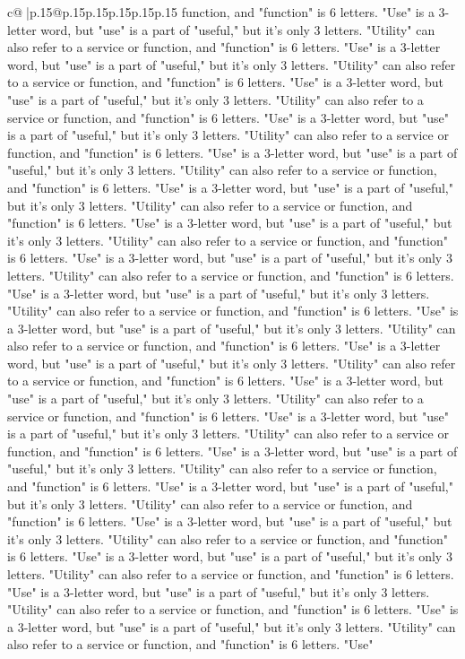 \documentclass{article}
\begin{document}
{\begin{supertabular}{c@{$\;$}|p{.15\linewidth}@{}p{.15\linewidth}p{.15\linewidth}p{.15\linewidth}p{.15\linewidth}p{.15\linewidth}}
{{{function, and "function" is 6 letters. "Use" is a 3{-}letter word, but "use" is a part of "useful," but it's only 3 letters. "Utility" can also refer to a service or function, and "function" is 6 letters. "Use" is a 3{-}letter word, but "use" is a part of "useful," but it's only 3 letters. "Utility" can also refer to a service or function, and "function" is 6 letters. "Use" is a 3{-}letter word, but "use" is a part of "useful," but it's only 3 letters. "Utility" can also refer to a service or function, and "function" is 6 letters. "Use" is a 3{-}letter word, but "use" is a part of "useful," but it's only 3 letters. "Utility" can also refer to a service or function, and "function" is 6 letters. "Use" is a 3{-}letter word, but "use" is a part of "useful," but it's only 3 letters. "Utility" can also refer to a service or function, and "function" is 6 letters. "Use" is a 3{-}letter word, but "use" is a part of "useful," but it's only 3 letters. "Utility" can also refer to a service or function, and "function" is 6 letters. "Use" is a 3{-}letter word, but "use" is a part of "useful," but it's only 3 letters. "Utility" can also refer to a service or function, and "function" is 6 letters. "Use" is a 3{-}letter word, but "use" is a part of "useful," but it's only 3 letters. "Utility" can also refer to a service or function, and "function" is 6 letters. "Use" is a 3{-}letter word, but "use" is a part of "useful," but it's only 3 letters. "Utility" can also refer to a service or function, and "function" is 6 letters. "Use" is a 3{-}letter word, but "use" is a part of "useful," but it's only 3 letters. "Utility" can also refer to a service or function, and "function" is 6 letters. "Use" is a 3{-}letter word, but "use" is a part of "useful," but it's only 3 letters. "Utility" can also refer to a service or function, and "function" is 6 letters. "Use" is a 3{-}letter word, but "use" is a part of "useful," but it's only 3 letters. "Utility" can also refer to a service or function, and "function" is 6 letters. "Use" is a 3{-}letter word, but "use" is a part of "useful," but it's only 3 letters. "Utility" can also refer to a service or function, and "function" is 6 letters. "Use" is a 3{-}letter word, but "use" is a part of "useful," but it's only 3 letters. "Utility" can also refer to a service or function, and "function" is 6 letters. "Use" is a 3{-}letter word, but "use" is a part of "useful," but it's only 3 letters. "Utility" can also refer to a service or function, and "function" is 6 letters. "Use" is a 3{-}letter word, but "use" is a part of "useful," but it's only 3 letters. "Utility" can also refer to a service or function, and "function" is 6 letters. "Use" is a 3{-}letter word, but "use" is a part of "useful," but it's only 3 letters. "Utility" can also refer to a service or function, and "function" is 6 letters. "Use" is a 3{-}letter word, but "use" is a part of "useful," but it's only 3 letters. "Utility" can also refer to a service or function, and "function" is 6 letters. "Use" is a 3{-}letter word, but "use" is a part of "useful," but it's only 3 letters. "Utility" can also refer to a service or function, and "function" is 6 letters. "Use" }}}
\end{supertabular}}
\end{document}

